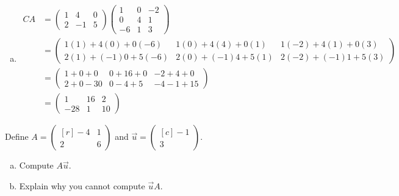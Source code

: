 \documentclass[12pt,letterpaper]{exam}
\begin{document}
\begin{questions}
\begin{enumerate}[(a)]
\item 
	\[
	\begin{aligned}
	CA&= 
	\begin{pmatrix}
	1 & 4 & 0 \\
	2 & -1 & 5 
	\end{pmatrix}
	\begin{pmatrix}
	1 & 0 & -2 \\
	0 & 4 & 1 \\
	-6 & 1 & 3
	\end{pmatrix} \\[0.3cm]
	&= \begin{pmatrix}
	1(1) + 4(0) + 0(-6) & 1(0) + 4(4) + 0(1) & 1(-2) + 4(1) + 0(3) \\
	2(1) + (-1)0 + 5(-6) & 2(0) + (-1)4 + 5(1) & 2(-2) + (-1)1 + 5(3) 
	\end{pmatrix} \\[0.3cm]
	&= \begin{pmatrix}
	1 + 0 + 0 & 0 + 16 + 0 & -2 + 4 + 0 \\
	2 + 0 - 30 & 0 - 4 + 5 & -4 - 1 + 15 
	\end{pmatrix} \\[0.3cm]
	&= \begin{pmatrix}
	1 & 16 & 2 \\
	-28 & 1 & 10 
	\end{pmatrix}
	\end{aligned}
	\]
\end{enumerate}



\newpage
\question[10] Define $A= \begin{pmatrix*}[r] -4 & 1 \\ 2 & 6 \end{pmatrix*}$ and $\vec{u}= \begin{pmatrix*}[c] -1 \\ 3 \end{pmatrix*}$. 
	\begin{enumerate}[(a)]
	\item Compute $A \vec{u}$.
	\item Explain why you cannot compute $\vec{u} A$. 
	\end{enumerate} \pspace


\end{questions}
\end{document}
